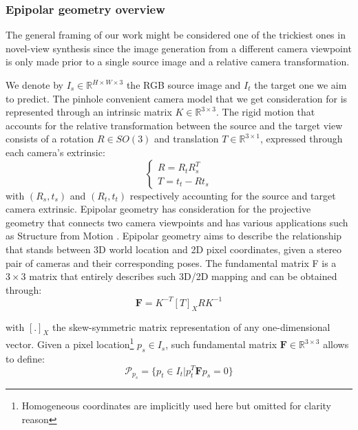 \subsubsection{Epipolar geometry overview }

The general framing of our work might be considered one of the trickiest ones in novel-view synthesis since the image generation from a different camera viewpoint is only made prior to a single source image and a relative camera transformation. 

We denote by $I_{s} \in \mathbb{R}^{H\times W\times 3}$ the RGB source image and $I_{t}$ the target one we aim to predict.
The pinhole convenient camera model that we get consideration for is represented through an intrinsic matrix $K \in \mathbb{R}^{3\times3}$. The rigid motion that accounts for the relative transformation between the source and the target view consists of a rotation $R \in SO(3)$ and translation $T\in \mathbb{R}^{3\times1}$, expressed through each camera's extrinsic:
\begin{equation}
     \begin{cases}
     R = R_{t} R_{s}^{T} \\
     T = t_{t} - R t_{s}
     \end{cases}
\end{equation}
with $(R_{s},t_{s})$ and $(R_{t},t_{t})$ respectively accounting for the source and target camera extrinsic. Epipolar geometry \citep{hartley2003multiple} has consideration for the projective geometry that connects two camera viewpoints and has various applications such as Structure from Motion \citep{tamaazousti2011nonlinear}. Epipolar geometry aims to describe the relationship that stands between 3D world location and 2D pixel coordinates, given a stereo pair of cameras and their corresponding poses. The fundamental matrix F is a $3\times3$ matrix that entirely describes such 3D/2D mapping and can be obtained through: 
\begin{equation}
    \mathbf{F} = K^{-T} [T]_{X} R  K^{-1}
\end{equation}

with $[.]_{X}$ the skew-symmetric matrix representation of any one-dimensional vector. Given a pixel location\footnote{Homogeneous coordinates are implicitly used here but omitted for clarity reason} $p_{s}\in I_{s}$, such fundamental matrix $\mathbf{F} \in \mathbb{R}^{3\times3}$ allows to define: 
\begin{equation}
    \mathcal{P}_{p_{s}} = \{p_{t}\in I_{t} | p_{t}^{T}\mathbf{F}p_{s} = 0 \}
\end{equation}

